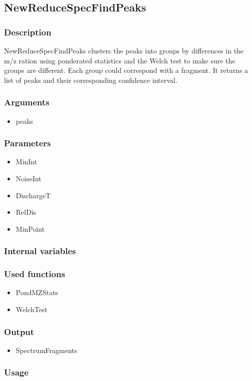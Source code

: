 \subsection{NewReduceSpecFindPeaks}
\subsubsection{Description}

NewReduceSpecFindPeaks clusters the peaks into groups by differences in the m/z ration using ponderated statistics and the Welch test to make sure the groups are different. Each group could correspond with a fragment. It returns a list of peaks and their corresponding confidence interval.

\subsubsection{Arguments}
\begin{itemize}
\item peaks
\end{itemize}
\subsubsection{Parameters}
\begin{itemize}
\item MinInt
\item NoiseInt
\item DischargeT
\item RelDis
\item MinPoint
\end{itemize}
\subsubsection{Internal variables}
\subsubsection{Used functions}
\begin{itemize}
\item PondMZStats
\item WelchTest
\end{itemize}
\subsubsection{Output}
\begin{itemize}
\item SpectrumFragments %
\end{itemize}

\subsubsection{Usage}

